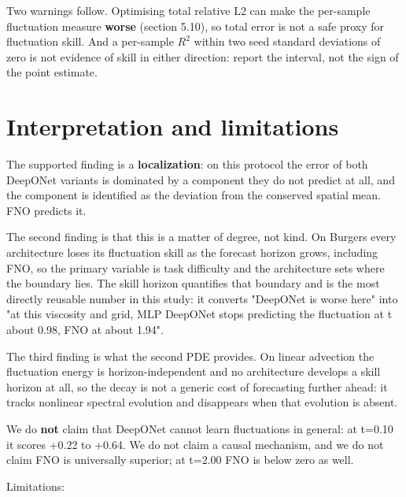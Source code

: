 \documentclass[preprint,12pt]{elsarticle}
\begin{document}
Two warnings follow. Optimising total relative L2 can make the per-sample fluctuation measure \textbf{worse} (section 5.10), so total error is not a safe proxy for fluctuation skill. And a per-sample $R^2$ within two seed standard deviations of zero is not evidence of skill in either direction: report the interval, not the sign of the point estimate.

\section{Interpretation and limitations}

The supported finding is a \textbf{localization}: on this protocol the error of both DeepONet variants is dominated by a component they do not predict at all, and the component is identified as the deviation from the conserved spatial mean. FNO predicts it.

The second finding is that this is a matter of degree, not kind. On Burgers every architecture loses its fluctuation skill as the forecast horizon grows, including FNO, so the primary variable is task difficulty and the architecture sets where the boundary lies. The skill horizon quantifies that boundary and is the most directly reusable number in this study: it converts "DeepONet is worse here" into "at this viscosity and grid, MLP DeepONet stops predicting the fluctuation at t about 0.98, FNO at about 1.94".

The third finding is what the second PDE provides. On linear advection the fluctuation energy is horizon-independent and no architecture develops a skill horizon at all, so the decay is not a generic cost of forecasting further ahead: it tracks nonlinear spectral evolution and disappears when that evolution is absent.

We do \textbf{not} claim that DeepONet cannot learn fluctuations in general: at t=0.10 it scores +0.22 to +0.64. We do not claim a causal mechanism, and we do not claim FNO is universally superior; at t=2.00 FNO is below zero as well.

Limitations:
\end{document}
